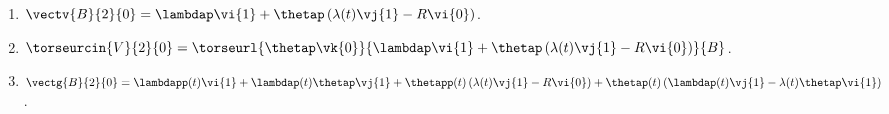 \ifprof
\else
\ifcolle
\else
\begin{solution}
\begin{enumerate}
\item $\vectv{B}{2}{0} = \lambdap\vi{1} + \thetap\left(\lambda(t)\vj{1}-R\vi{0} \right)$.
\item $\torseurcin{V}{2}{0}=\torseurl{\thetap \vk{0}}{ \lambdap\vi{1} + \thetap\left(\lambda(t)\vj{1}-R\vi{0} \right)}{B}$.
\item $\vectg{B}{2}{0}  = \lambdapp(t)\vi{1} +\lambdap(t)\thetap\vj{1} 
+ \thetapp(t)\left(\lambda(t)\vj{1}-R\vi{0} \right)
+ \thetap(t)\left(\lambdap(t)\vj{1}-\lambda(t)\thetap\vi{1} \right)
$.
\end{enumerate} 
\end{solution}
\fi

\fi


